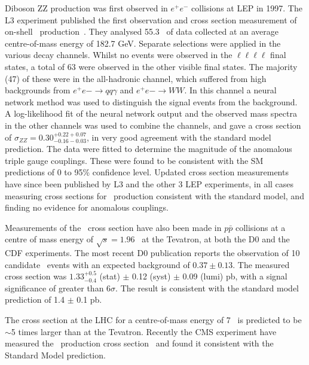 Diboson ZZ production was first observed in $e^+e^-$ collisions at LEP in 1997.
The L3 experiment published the first observation and cross section measurement
of on-shell \ZZ\ production~\cite{Acciarri1999281}. They analysed 55.3 \ivpb\
of data collected at an average centre-of-mass energy of 182.7 GeV. Separate
selections were applied in the various decay channels. Whilst no events were
observed in the $\ell\ell\ell\ell$ final states, a total of 63 were observed in
the other visible final states. The majority (47) of these were in the
all-hadronic channel, which suffered from high backgrounds from $e^+e-
\rightarrow qq \gamma$ and $e^+e- \rightarrow WW$. In this channel a neural
network method was used to distinguish the signal events from the background. A
log-likelihood fit of the neural network output and the observed mass spectra in
the other channels was used to combine the channels, and gave a cross section of
$\sigma_{ZZ} = 0.30^{+0.22 +0.07}_{-0.16 -0.03}$, in very good agreement with
the standard model prediction. The data were fitted to determine the magnitude
of the anomalous triple gauge couplings. These were found to be consistent with
the SM predictions of 0 to 95\% confidence level. Updated cross section
measurements have since been published by L3 and the other 3 LEP experiments, in
all cases measuring cross sections for \ZZ\ production consistent with the
standard model, and finding no evidence for anomalous couplings.

Measurements of the \ZZ\ cross section have also been made in $p \bar{p}$
collisions at a centre of mass energy of $\sqrt{s} = 1.96$ \tev\ at the Tevatron, at
both the D0 and the CDF experiments. The most recent D0 publication reports the
observation of 10 candidate \ZZ\ events with an expected background of $0.37
\pm 0.13$. The measured cross section was $1.33^{+0.5}_{-0.4}$ (stat) $\pm$ 0.12
(syst) $\pm$ 0.09 (lumi) pb, with a signal significance of greater than
$6\sigma$. The result is consistent with the standard model prediction of 1.4
$\pm$ 0.1 pb. 

The cross section at the LHC for a centre-of-mass energy of 7 \TeV\ is predicted to be $\sim$5 times larger 
than at the Tevatron. 
Recently the CMS experiment have measured the \ZZ\ production cross
section~\cite{CMS-PAS-EWK-11-010} and found it consistent with the Standard Model prediction.



